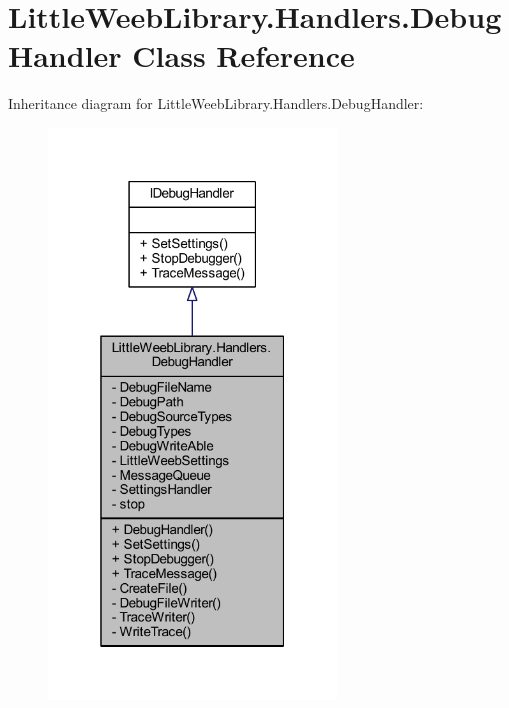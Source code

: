 \hypertarget{class_little_weeb_library_1_1_handlers_1_1_debug_handler}{}\section{Little\+Weeb\+Library.\+Handlers.\+Debug\+Handler Class Reference}
\label{class_little_weeb_library_1_1_handlers_1_1_debug_handler}


Inheritance diagram for Little\+Weeb\+Library.\+Handlers.\+Debug\+Handler\+:\nopagebreak
\begin{figure}[H]
\begin{center}
\leavevmode
\includegraphics[width=217pt]{class_little_weeb_library_1_1_handlers_1_1_debug_handler__inherit__graph}
\end{center}
\end{figure}


